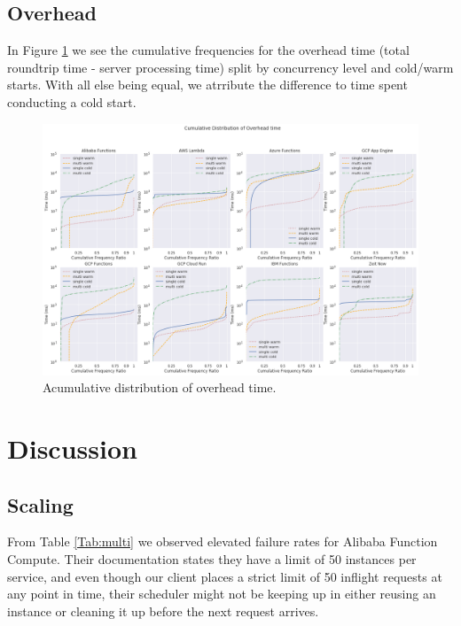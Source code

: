 \documentclass[11pt]{article}
\begin{document}
\subsection{Overhead}

In Figure \ref{Fig:overhead}
we see the cumulative frequencies for the overhead time
(total roundtrip time - server processing time) %
split by concurrency level and cold/warm starts.
With all else being equal,
we atrribute the difference to time spent conducting a cold start.




\begin{figure}[h]
\includegraphics[width=14cm]{overhead.png}
\centering
\caption{Acumulative distribution of overhead time.}
\label{Fig:overhead}
\end{figure}



\section{Discussion}
\label{discussion}

\subsection{Scaling}
From Table \ref{Tab:multi}
we observed elevated failure rates for Alibaba Function Compute.
Their documentation \cite{ali}
states they have a limit of 50 instances per service,
and even though our client places a strict limit of 50 inflight requests at any point in time,
their scheduler might not be keeping up
in either reusing an instance or cleaning it up before the next request arrives.
\end{document}
